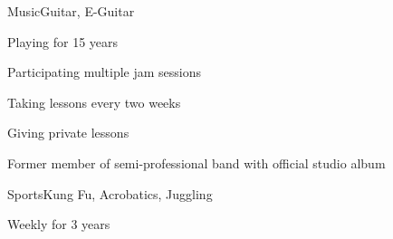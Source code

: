 \documentclass[a4paper,10pt]{cv}
\begin{document}
  \bigskip
    \vspace{-1em}
    \begin{multicols}{2}
      \begin{cvTimeItem}{Music}{Guitar, E-Guitar}
        \begin{cvItemize}
          \item Playing for 15 years
          \item Participating multiple jam sessions
          \item Taking lessons every two weeks
          \item Giving private lessons
          \item Former member of semi-professional band  with official studio album
        \end{cvItemize}
      \end{cvTimeItem}
      \begin{cvTimeItem}{Sports}{Kung Fu, Acrobatics, Juggling}
        \begin{cvItemize}
          \item Weekly for 3 years
        \end{cvItemize}
      \end{cvTimeItem}
    \end{multicols}
\end{document}

